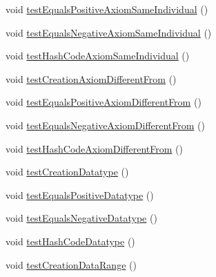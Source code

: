 \begin{DoxyCompactItemize}
\item 
void \hyperlink{classorg_1_1semanticweb_1_1owlapi_1_1datafactory_1_1_o_w_l_data_factory_test_case_af852f350ab8d2cda545a09c390fcc432}{test\-Equals\-Positive\-Axiom\-Same\-Individual} ()
\item 
void \hyperlink{classorg_1_1semanticweb_1_1owlapi_1_1datafactory_1_1_o_w_l_data_factory_test_case_ae9822babeb00b43d3c1fe89c876bfba3}{test\-Equals\-Negative\-Axiom\-Same\-Individual} ()
\item 
void \hyperlink{classorg_1_1semanticweb_1_1owlapi_1_1datafactory_1_1_o_w_l_data_factory_test_case_a6b2eb97caa707d36e5a3b6884dd6f305}{test\-Hash\-Code\-Axiom\-Same\-Individual} ()
\item 
void \hyperlink{classorg_1_1semanticweb_1_1owlapi_1_1datafactory_1_1_o_w_l_data_factory_test_case_a5aea695aacadc200a010c47e7ba20716}{test\-Creation\-Axiom\-Different\-From} ()
\item 
void \hyperlink{classorg_1_1semanticweb_1_1owlapi_1_1datafactory_1_1_o_w_l_data_factory_test_case_a37b66e72840c0597153c183550c1526e}{test\-Equals\-Positive\-Axiom\-Different\-From} ()
\item 
void \hyperlink{classorg_1_1semanticweb_1_1owlapi_1_1datafactory_1_1_o_w_l_data_factory_test_case_a6ec0ba6691c01e2a1905798aa63a300c}{test\-Equals\-Negative\-Axiom\-Different\-From} ()
\item 
void \hyperlink{classorg_1_1semanticweb_1_1owlapi_1_1datafactory_1_1_o_w_l_data_factory_test_case_aea299ef116b7fa0d26abd623ed5de423}{test\-Hash\-Code\-Axiom\-Different\-From} ()
\item 
void \hyperlink{classorg_1_1semanticweb_1_1owlapi_1_1datafactory_1_1_o_w_l_data_factory_test_case_a8ef35654014914e48dfd73d0d9e93941}{test\-Creation\-Datatype} ()
\item 
void \hyperlink{classorg_1_1semanticweb_1_1owlapi_1_1datafactory_1_1_o_w_l_data_factory_test_case_a43cdc256fa6667833b18f044110f8080}{test\-Equals\-Positive\-Datatype} ()
\item 
void \hyperlink{classorg_1_1semanticweb_1_1owlapi_1_1datafactory_1_1_o_w_l_data_factory_test_case_a13fb4a7a1138a45078c895f6d4e0eac8}{test\-Equals\-Negative\-Datatype} ()
\item 
void \hyperlink{classorg_1_1semanticweb_1_1owlapi_1_1datafactory_1_1_o_w_l_data_factory_test_case_a7b1fcccd381ccd80078c1ae6b8b857ed}{test\-Hash\-Code\-Datatype} ()
\item 
void \hyperlink{classorg_1_1semanticweb_1_1owlapi_1_1datafactory_1_1_o_w_l_data_factory_test_case_aa6548268f7a7bbfbcaffd63fb92d5ea0}{test\-Creation\-Data\-Range} ()

\end{DoxyCompactItemize}
